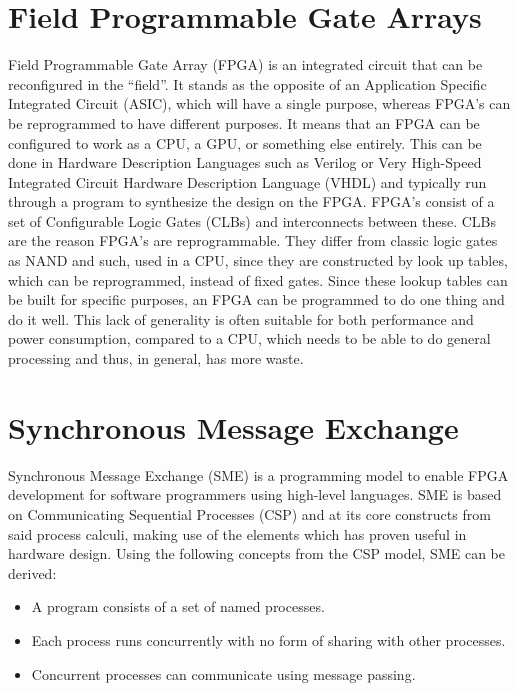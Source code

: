 \documentclass[a4paper, openany]{book}
\begin{document}
\begin{abstact}
\section{Field Programmable Gate Arrays}
\label{sec:org1e2f4d4}
Field Programmable Gate Array (FPGA) is an integrated circuit that can be reconfigured in the ``field''. It stands as the opposite of an Application Specific Integrated Circuit (ASIC), which will have a single purpose, whereas FPGA's can be reprogrammed to have different purposes. It means that an FPGA can be configured to work as a CPU, a GPU, or something else entirely. This can be done in Hardware Description Languages such as Verilog or Very High-Speed Integrated Circuit Hardware Description Language (VHDL) and typically run through a program to synthesize the design on the FPGA.
FPGA's consist of a set of Configurable Logic Gates (CLBs) and interconnects between these. CLBs are the reason FPGA's are reprogrammable. They differ from classic logic gates as NAND and such, used in a CPU, since they are constructed by look up tables, which can be reprogrammed, instead of fixed gates. Since these lookup tables can be built for specific purposes, an FPGA can be programmed to do one thing and do it well. This lack of generality is often suitable for both performance and power consumption, compared to a CPU, which needs to be able to do general processing and thus, in general, has more waste.

\section{Synchronous Message Exchange}
\label{sec:SME}
Synchronous Message Exchange (SME) is a programming model to enable FPGA development for software programmers using high-level languages. SME is based on Communicating Sequential Processes (CSP) and at its core constructs from said process calculi, making use of the elements which has proven useful in hardware design\cite{sme}. Using the following concepts from the CSP model\cite{CSP}, SME can be derived:

\begin{itemize}
\item A program consists of a set of named processes.
\item Each process runs concurrently with no form of sharing with other processes.
\item Concurrent processes can communicate using message passing.
\end{itemize}


\end{abstact}
\end{document}
